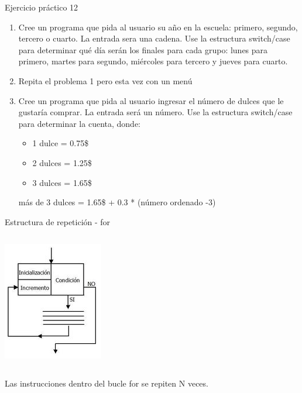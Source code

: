 \documentclass{bredelebeamer}
\begin{document}
\begin{frame}{Ejercicio práctico 12}
\begin{enumerate}
\item Cree un programa que pida al usuario su año en la escuela: primero, segundo, tercero o cuarto. La entrada sera una cadena. Use la estructura switch/case para determinar qué día serán los finales para cada grupo: lunes para primero, martes para segundo, miércoles para tercero y jueves para cuarto.
\item Repita el problema 1 pero esta vez con un menú
\item Cree un programa que pida al usuario ingresar el número de dulces que le gustaría comprar. La entrada será un número. Use la estructura switch/case para determinar la cuenta, donde:
\begin{itemize}
\item 1 dulce = 0.75\$
\item 2 dulces = 1.25\$
\item 3 dulces = 1.65\$
\end{itemize}
más de 3 dulces = 1.65\$ + 0.3 * (número ordenado -3)
\end{enumerate}
\end{frame}

\begin{frame}{Estructura de repetición - for}
\begin{columns}
\begin{column}{0.5\textwidth}
\begin{center}
\includegraphics[scale=0.7]{images/pantalla8.png}
\end{center}
\end{column}
\begin{column}{0.5\textwidth}

\end{column}
\end{columns}
\begin{center}
Las instrucciones dentro del bucle for se repiten N veces.
\end{center}
\end{frame}
\end{document}

